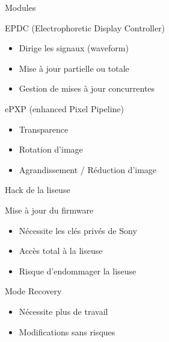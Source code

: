 \begin{frame}{Modules}
	\vspace{-25px}
	\begin{block}{EPDC (Electrophoretic Display Controller)}
		\begin{itemize}
			\item{Dirige les signaux (waveform)}
			\item{Mise à jour partielle ou totale}
			\item{Gestion de mises à jour concurrentes}
		\end{itemize}
	\end{block}
	\begin{block}{ePXP (enhanced Pixel Pipeline)}
		\begin{itemize}
			\item Transparence
			\item Rotation d'image
			\item Agrandissement / Réduction d'image
		\end{itemize}
	\end{block}
\end{frame}

\begin{frame}{Hack de la liseuse}
	\begin{block}{Mise à jour du firmware}
		\begin{itemize}
			\item Nécessite les clés privés de Sony
			\item Accès total à la liseuse
			\item Risque d'endommager la liseuse
		\end{itemize}
	\end{block}
	\begin{block}{Mode Recovery}
		\begin{itemize}
			\item Nécessite plus de travail
			\item Modifications sans risques
		\end{itemize}
	\end{block}
\end{frame}
